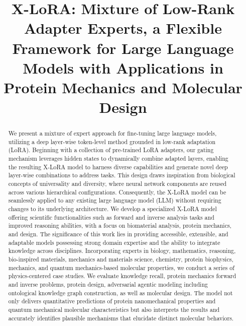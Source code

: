 \title{X-LoRA: Mixture of Low-Rank Adapter Experts, a Flexible Framework for Large Language Models with Applications in Protein Mechanics and Molecular Design}

\begin{abstract}
We present a mixture of expert approach for fine-tuning large language models, utilizing a deep layer-wise token-level method grounded in low-rank adaptation (LoRA). Beginning with a collection of pre-trained LoRA adapters, our gating mechanism leverages hidden states to dynamically combine adapted layers, enabling the resulting X-LoRA model to harness diverse capabilities and generate novel deep layer-wise combinations to address tasks. This design draws inspiration from biological concepts of universality and diversity, where neural network components are reused across various hierarchical configurations. Consequently, the X-LoRA model can be seamlessly applied to any existing large language model (LLM) without requiring changes to its underlying architecture. We develop a specialized X-LoRA model offering scientific functionalities such as forward and inverse analysis tasks and improved reasoning abilities, with a focus on biomaterial analysis, protein mechanics, and design. The significance of this work lies in providing accessible, extensible, and adaptable models possessing strong domain expertise and the ability to integrate knowledge across disciplines. Incorporating experts in biology, mathematics, reasoning, bio-inspired materials, mechanics and materials science, chemistry, protein biophysics, mechanics, and quantum mechanics-based molecular properties, we conduct a series of physics-centered case studies. We evaluate knowledge recall, protein mechanics forward and inverse problems, protein design, adversarial agentic modeling including ontological knowledge graph construction, as well as molecular design. The model not only delivers quantitative predictions of protein nanomechanical properties and quantum mechanical molecular characteristics but also interprets the results and accurately identifies plausible mechanisms that elucidate distinct molecular behaviors.
\end{abstract}

